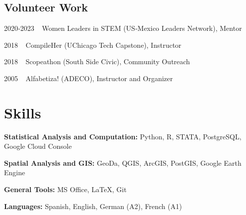 \documentclass[12pt,letterpaper]{report}
\begin{document}
    \subsection*{Volunteer Work}
    \begin{tablist}
    \item[2020‑2023] $\>$ $\>${}Women Leaders in STEM (US‑Mexico Leaders Network), Mentor
    \item[2018] \tab{}$\>$  $\>$CompileHer (UChicago Tech Capstone), Instructor
    \item[2018] \tab{}$\>$  $\>$Scopeathon (South Side Civic), Community Outreach
    \item[2005] \tab{}$\>$  $\>$Alfabetiza! (ADECO), Instructor and Organizer
    \end{tablist}
    
    \section*{Skills}
    \begin{tablist}
        \item[\textbf{Statistical Analysis and Computation:}] Python, R, STATA, PostgreSQL, Google Cloud Console
        \item[\textbf{Spatial Analysis and GIS:}] GeoDa, QGIS, ArcGIS, PostGIS, Google Earth Engine
        \item[\textbf{General Tools:}] MS Office, LaTeX, Git
        \item[\textbf{Languages:}] Spanish, English, German (A2), French (A1)
    \end{tablist}
\end{document}
